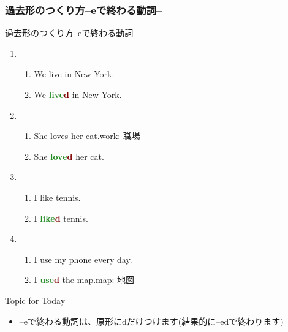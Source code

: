 \documentclass[aspectratio=169,xcolor={dvipsnames,table}]{beamer}
\newcommand{\myaudio}[1]{\href{#1}{\faVolumeUp}}
\begin{document}
\subsubsection{過去形のつくり方--eで終わる動詞--}
\begin{frame}[plain]{過去形のつくり方--eで終わる動詞--}
 
\begin{enumerate}
 \item \begin{enumerate}
	\item We live in New York.
	\item We \textcolor{ForestGreen}{\bfseries live}\textcolor{Maroon}{\bfseries d} in New York.
       \end{enumerate}
 \item \begin{enumerate}
	\item She loves her cat.\hfill{}{\small work: 職場}
	\item She  \textcolor{ForestGreen}{\bfseries love}\textcolor{Maroon}{\bfseries d} her cat.
       \end{enumerate} \item \begin{enumerate}
	\item I like tennis.
	\item I  \textcolor{ForestGreen}{\bfseries like}\textcolor{Maroon}{\bfseries d} tennis.
       \end{enumerate}
 \item \begin{enumerate}
	\item I use my phone every day.
	\item I  \textcolor{ForestGreen}{\bfseries use}\textcolor{Maroon}{\bfseries d} the map.\hfill{{\small map: 地図}}
       \end{enumerate}
\end{enumerate}

\begin{exampleblock}{Topic for Today}\small
\begin{itemize}
 \item --eで終わる動詞は、原形にdだけつけます(結果的に--edで終わります)
\end{itemize}
\end{exampleblock}

\hfill\myaudio{./audio/025_past_do_05.mp3}

\end{frame}
\end{document}
